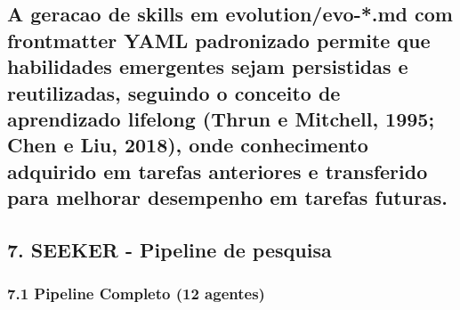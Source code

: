 \documentclass[
  12pt,
]{article}
\begin{document}
\subsection{A geracao de skills em evolution/evo-*.md com frontmatter
YAML padronizado permite que habilidades emergentes sejam persistidas e
reutilizadas, seguindo o conceito de aprendizado lifelong (Thrun e
Mitchell, 1995; Chen e Liu, 2018), onde conhecimento adquirido em
tarefas anteriores e transferido para melhorar desempenho em tarefas
futuras.}\label{a-geracao-de-skills-em-evolutionevo-.md-com-frontmatter-yaml-padronizado-permite-que-habilidades-emergentes-sejam-persistidas-e-reutilizadas-seguindo-o-conceito-de-aprendizado-lifelong-thrun-e-mitchell-1995-chen-e-liu-2018-onde-conhecimento-adquirido-em-tarefas-anteriores-e-transferido-para-melhorar-desempenho-em-tarefas-futuras.}

\subsection{7. SEEKER - Pipeline de
pesquisa}\label{seeker---pipeline-de-pesquisa}

\subsubsection{7.1 Pipeline Completo (12
agentes)}\label{pipeline-completo-12-agentes}
\end{document}
